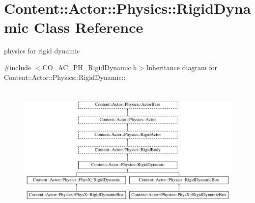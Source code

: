 \hypertarget{classContent_1_1Actor_1_1Physics_1_1RigidDynamic}{
\section{Content::Actor::Physics::RigidDynamic Class Reference}
\label{classContent_1_1Actor_1_1Physics_1_1RigidDynamic}
}


physics for rigid dynamic  


{\ttfamily \#include $<$CO\_\-AC\_\-PH\_\-RigidDynamic.h$>$}Inheritance diagram for Content::Actor::Physics::RigidDynamic::\begin{figure}[H]
\begin{center}
\leavevmode
\includegraphics[height=6.59933cm]{classContent_1_1Actor_1_1Physics_1_1RigidDynamic}
\end{center}
\end{figure}
